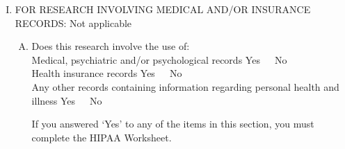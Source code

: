 \documentclass[12pt]{article}
\newcommand{\na}{{\color{blue}Not applicable} }
\newcommand{\yn}{{Yes~~~No\\ }}
\begin{document}
\begin{enumerate}[I.]
            \begin{enumerate}[A.]
                \item Are these materials linked in any way to the patient
                    (code, identifier, or other link to
                            patient identity)? \yn
                \item Are you involved in the design of the study for which the
                    materials are being collected? \yn
                \item Will your name appear on publications resulting from this
                    research? \yn
                \item Where are the subjects from whom this material is being
                    collected?
                \item Has an IRB at the institution releasing this material
                    reviewed the proposed project? \yn
                                (If 'Yes", please provide documentation.)
                \item Regarding the above materials or data, will you be:\\
                    Collecting them \yn
                    Receiving them \yn
                    Sending them \yn

                \item Do the materials already exist? \yn

                \item Are the materials being collected for the purpose of this
                    study? \yn

                \item Do the materials come from subjects who are: \\
                    Minors \yn
                    Prisoners \yn
                    Pregnant women \yn

                \item J. Does this material originate from a patient population
                    that, for religious or other reasons,
                            would prohibit its use in biomedical research?
                            Yes No Unknown source

           \end{enumerate}

    \item FOR RESEARCH INVOLVING MEDICAL AND/OR INSURANCE RECORDS: \na

            \begin{enumerate}[A.]
                \item Does this research involve the use of: \\
                      Medical, psychiatric and/or psychological records \yn
                      Health insurance records   \yn
                      Any other records containing information regarding personal
                                            health and illness \yn

                If you answered `Yes' to any of the items in this section, you
                must complete the HIPAA Worksheet.
            \end{enumerate}

\end{enumerate}
\end{document}
